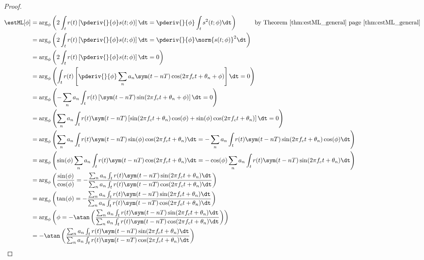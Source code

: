\begin{proof}

\begin{align*}
   \estML[\phi]
     &=    \arg_\phi\left(
            2\int_t r(t)\left[\pderiv{}{\phi}s(t;\phi)\right] \dt =
            \pderiv{}{\phi}\int_t s^2(t;\phi) \dt
            \right)
            \hspace{1cm}\mbox{by Theorem~\ref{thm:estML_general} page~\pageref{thm:estML_general}}
   \\&=    \arg_\phi\left(
            2\int_t r(t)\left[\pderiv{}{\phi}s(t;\phi)\right] \dt =
            \pderiv{}{\phi}\norm{s(t;\phi)}^2 \dt
            \right)
   \\&=    \arg_\phi\left(
            2\int_t r(t)\left[\pderiv{}{\phi}s(t;\phi)\right] \dt = 0
            \right)
   \\&=    \arg_\phi\left(
            \int_t r(t)\left[\pderiv{}{\phi}\sum_n a_n \sym(t-nT)\cos(2\pi f_ct+\theta_n+\phi)\right] \dt = 0
            \right)
   \\&=    \arg_\phi\left(
            -\sum_n a_n \int_t r(t)\left[\sym(t-nT)\sin(2\pi f_ct+\theta_n+\phi)\right] \dt = 0
            \right)
   \\&=    \arg_\phi\left(
            \sum_n a_n \int_t r(t)\sym(t-nT)\left[
            \sin(2\pi f_ct+\theta_n)\cos(\phi) +
            \sin(\phi)\cos(2\pi f_ct+\theta_n)
            \right] \dt = 0
            \right)
   \\&=    \arg_\phi\left(
            \sum_n a_n \int_t r(t)\sym(t-nT)
            \sin(\phi)\cos(2\pi f_ct+\theta_n) \dt
            = -
            \sum_n a_n \int_t r(t)\sym(t-nT)
            \sin(2\pi f_ct+\theta_n)\cos(\phi) \dt
            \right)
   \\&=    \arg_\phi\left(
            \sin(\phi)\sum_n a_n \int_t r(t)\sym(t-nT)
            \cos(2\pi f_ct+\theta_n) \dt
            = -
            \cos(\phi)\sum_n a_n \int_t r(t)\sym(t-nT)
            \sin(2\pi f_ct+\theta_n) \dt
            \right)
   \\&=    \arg_\phi\left(
            \frac{\sin(\phi)}{\cos(\phi)}
            =-
            \frac{\sum_n a_n \int_t r(t)\sym(t-nT)\sin(2\pi f_ct+\theta_n) \dt}
                 {\sum_n a_n \int_t r(t)\sym(t-nT)\cos(2\pi f_ct+\theta_n) \dt}
            \right)
   \\&=    \arg_\phi\left(
            \tan(\phi)
            =-
            \frac{\sum_n a_n \int_t r(t)\sym(t-nT)\sin(2\pi f_ct+\theta_n) \dt}
                 {\sum_n a_n \int_t r(t)\sym(t-nT)\cos(2\pi f_ct+\theta_n) \dt}
            \right)
   \\&=    \arg_\phi\left(
            \phi =-\atan\left(
            \frac{\sum_n a_n \int_t r(t)\sym(t-nT)\sin(2\pi f_ct+\theta_n) \dt}
                 {\sum_n a_n \int_t r(t)\sym(t-nT)\cos(2\pi f_ct+\theta_n) \dt}
            \right)
            \right)
   \\&=    -\atan\left(
            \frac{\sum_n a_n \int_t r(t)\sym(t-nT)\sin(2\pi f_ct+\theta_n) \dt}
                 {\sum_n a_n \int_t r(t)\sym(t-nT)\cos(2\pi f_ct+\theta_n) \dt}
            \right)
\end{align*}
\end{proof}




